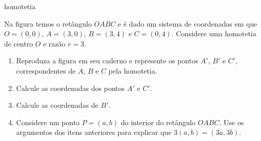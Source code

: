 \begin{task}{ homotetia}
\label{ativ-vetores-homotetia}



Na figura temos o retângulo \(OABC\) e é dado um sistema de coordenadas em que \(O=(0,0)\), \(A=(3,0)\), \(B=(3,4)\) e \(C=(0,4)\).
Considere uma homotetia de centro \(O\) e razão \(r=3\).
\begin{center}
\end{center}\begin{enumerate}
\item {} 
Reproduza a figura em seu caderno e represente os pontos \(A'\), \(B'\) e \(C'\), correspondentes de \(A\), \(B\) e \(C\) pela homotetia.

\item {} 
Calcule as coordenadas dos pontos \(A'\) e \(C'\).

\item {} 
Calcule as coordenadas de \(B'\).

\item {} 
Considere um ponto \(P=(a,b)\) do interior do retângulo \(OABC\). Use os argumentos dos itens anteriores para explicar que \(3(a,b)=(3a,3b)\).

\end{enumerate}
\end{task}



